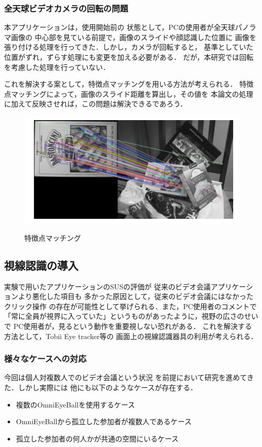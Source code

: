 \subsubsection*{全天球ビデオカメラの回転の問題}

本アプリケーションは，使用開始前の
状態として，PCの使用者が全天球パノラマ画像の
中心部を見ている前提で，画像のスライドや顔認識した位置に
画像を張り付ける処理を行ってきた．しかし，カメラが回転すると，
基準としていた位置がずれ，ずらす処理にも変更を加える必要がある．
だが，本研究では回転を考慮した処理を行っていない．

これを解決する案として，特徴点マッチングを用いる方法が考えられる．
特徴点マッチングによって，画像のスライド距離を算出し，その値を
本論文の処理に加えて反映させれば，この問題は解決できるであろう．

\begin{figure}[tp]
  \centering
  \includegraphics[scale=0.7]{fig/matching.png}
  \caption{特徴点マッチング} \cite{17}
\end{figure}

\subsection*{視線認識の導入}
実験で用いたアプリケーションのSUSの評価が
従来のビデオ会議アプリケーションより悪化した項目も
多かった原因として，従来のビデオ会議にはなかったクリック操作
の存在が可能性として挙げられる．また，PC使用者のコメントで
「常に全員が視界に入っていた」というものがあったように，視野の広さのせいで
PC使用者が，見るという動作を重要視しない恐れがある．
これを解決する方法として，Tobii Eye tracker\cite{30}等の
画面上の視線認識器具の利用が考えられる．

\subsubsection*{様々なケースへの対応}
今回は個人対複数人でのビデオ会議という状況
を前提において研究を進めてきた．しかし実際には
他にも以下のようなケースが存在する．
\begin{itemize}
  \item 複数のOmniEyeBallを使用するケース
  \item OmniEyeBallから孤立した参加者が複数人であるケース
  \item 孤立した参加者の何人かが共通の空間にいるケース
\end{itemize}

